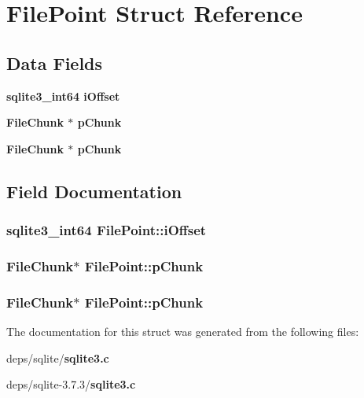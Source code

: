 \section{File\-Point Struct Reference}
\label{structFilePoint}
\subsection*{Data Fields}
\begin{CompactItemize}
\item 
\bf{sqlite3\_\-int64} \bf{i\-Offset}
\item 
\bf{File\-Chunk} $\ast$ \bf{p\-Chunk}
\item 
\bf{File\-Chunk} $\ast$ \bf{p\-Chunk}
\end{CompactItemize}


\subsection{Field Documentation}
\subsubsection{\setlength{\rightskip}{0pt plus 5cm}\bf{sqlite3\_\-int64} \bf{File\-Point::i\-Offset}}\label{structFilePoint_98594c21735e36813ac75f2c423ffea3}


\subsubsection{\setlength{\rightskip}{0pt plus 5cm}\bf{File\-Chunk}$\ast$ \bf{File\-Point::p\-Chunk}}\label{structFilePoint_ec69cddec8550de5801ffd0dff989485}


\subsubsection{\setlength{\rightskip}{0pt plus 5cm}\bf{File\-Chunk}$\ast$ \bf{File\-Point::p\-Chunk}}\label{structFilePoint_ec69cddec8550de5801ffd0dff989485}




The documentation for this struct was generated from the following files:\begin{CompactItemize}
\item 
deps/sqlite/\bf{sqlite3.c}\item 
deps/sqlite-3.7.3/\bf{sqlite3.c}\end{CompactItemize}
